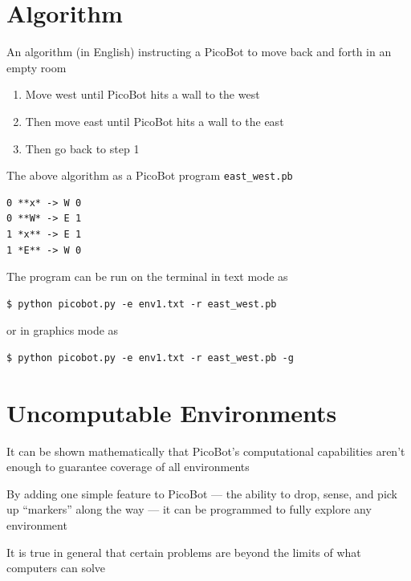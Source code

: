 \documentclass[8pt,a4paper,compress]{beamer}
\begin{document}
\section{Algorithm}
\begin{frame}[fragile]
\pause

An algorithm (in English) instructing a PicoBot to move back and forth in an empty room
\begin{enumerate}
\item Move west until PicoBot hits a wall to the west

\item Then move east until PicoBot hits a wall to the east

\item Then go back to step 1
\end{enumerate}

\pause
\bigskip

The above algorithm as a PicoBot program \lstinline{east_west.pb}
\begin{lstlisting}[language={}]
0 **x* -> W 0
0 **W* -> E 1
1 *x** -> E 1
1 *E** -> W 0
\end{lstlisting}

\pause
\bigskip

The program can be run on the terminal in text mode as
\begin{lstlisting}[language={}]
$ python picobot.py -e env1.txt -r east_west.pb
\end{lstlisting}

or in graphics mode as

\begin{lstlisting}[language={}]
$ python picobot.py -e env1.txt -r east_west.pb -g
\end{lstlisting}
\end{frame}

\section{Uncomputable Environments}
\begin{frame}[fragile]
\pause

It can be shown mathematically that PicoBot's computational capabilities aren't enough to guarantee coverage of all environments

\pause
\bigskip

By adding one simple feature to PicoBot --- the ability to drop, sense, and pick up ``markers'' along the way --- it can be programmed to fully explore any environment

\pause
\bigskip

It is true in general that certain problems are beyond the limits of what computers can solve
\end{frame}
\end{document}
